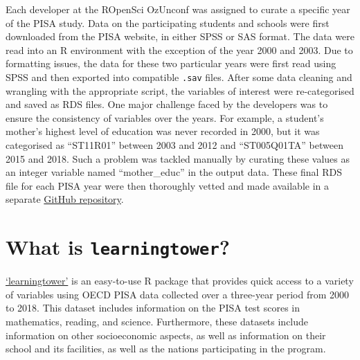 Each developer at the ROpenSci OzUnconf was assigned to curate a
specific year of the PISA study. Data on the participating students and
schools were first downloaded from the PISA website, in either SPSS or
SAS format. The data were read into an R environment with the exception
of the year 2000 and 2003. Due to formatting issues, the data for these
two particular years were first read using SPSS and then exported into
compatible \texttt{.sav} files. After some data cleaning and wrangling
with the appropriate script, the variables of interest were
re-categorised and saved as RDS files. One major challenge faced by the
developers was to ensure the consistency of variables over the years.
For example, a student's mother's highest level of education was never
recorded in 2000, but it was categorised as ``ST11R01'' between 2003 and
2012 and ``ST005Q01TA'' between 2015 and 2018. Such a problem was
tackled manually by curating these values as an integer variable named
``mother\_educ'' in the output data. These final RDS file for each PISA
year were then thoroughly vetted and made available in a separate
\href{https://github.com/kevinwang09/learningtower_masonry}{GitHub
repository}.

\hypertarget{what-is-learningtower}{%
\section{\texorpdfstring{What is
\texttt{learningtower}?}{What is learningtower?}}\label{what-is-learningtower}}

\href{https://cran.r-project.org/web/packages/learningtower/index.html}{`learningtower'}
\citep{learningtower} is an easy-to-use R package that provides quick
access to a variety of variables using OECD PISA data collected over a
three-year period from 2000 to 2018. This dataset includes information
on the PISA test scores in mathematics, reading, and science.
Furthermore, these datasets include information on other socioeconomic
aspects, as well as information on their school and its facilities, as
well as the nations participating in the program.

